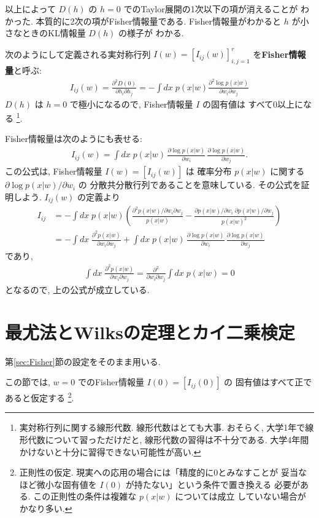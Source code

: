 \documentclass[12pt,twoside]{jarticle}
\renewcommand\d{\partial}
\theoremstyle{jplain}
\theoremstyle{jplain}
\theoremstyle{jplain}
\numberwithin{theorem}{section}
\numberwithin{equation}{section}
\numberwithin{figure}{section}
\numberwithin{table}{section}
\newcommand\secref[1]{第\ref{#1}節}
\begin{document}
以上によって $D(h)$ の $h=0$ でのTaylor展開の1次以下の項が消えることが
わかった. 本質的に2次の項がFisher情報量である.
Fisher情報量がわかると $h$ が小さなときのKL情報量 $D(h)$ の様子が
わかる.

次のようにして定義される実対称行列 $I(w)=[I_{ij}(w)]_{i,j=1}^r$
を{\bfseries Fisher情報量}と呼ぶ:
\begin{align*}
  I_{ij}(w) = \frac{\d^2 D(0)}{\d h_i\d h_j}
  = -\int dx\; p(x|w)\frac{\d^2 \log p(x|w)}{\d w_i\d w_j}
\end{align*}
$D(h)$ は $h=0$ で極小になるので, Fisher情報量 $I$ の固有値は
すべて0以上になる%
\footnote{実対称行列に関する線形代数. 線形代数はとても大事.
おそらく, 大学1年で線形代数について習っただけだと,
線形代数の習得は不十分である.
大学4年間かけないと十分に習得できない可能性が高い.}.

Fisher情報量は次のようにも表せる:
\begin{align*}
  I_{ij}(w)
  = \int dx\;
  p(x|w)\,
  \frac{\d \log p(x|w)}{\d w_i}\,
  \frac{\d \log p(x|w)}{\d w_j}.
\end{align*}
この公式は, Fisher情報量 $I(w)=[I_{ij}(w)]$ は
確率分布 $p(x|w)$ に関する $\d\log p(x|w)/\d w_i$ の
分散共分散行列であることを意味している.
その公式を証明しよう. $I_{ij}(w)$ の定義より
\begin{align*}
  I_{ij}
  &
  = -\int dx\;p(x|w)\left(
    \frac{\d^2 p(x|w)/\d w_i\d w_j}{p(x|w)}
    -\frac{\d p(x|w)/\d w_i\;\d p(x|w)/\d w_j}{p(x|w)^2}
  \right)
  \\ &
  = -\int dx\; \frac{\d^2 p(x|w)}{\d w_i \d w_j}
  + \int dx\; p(x|w)\,
  \frac{\d\log p(x|w)}{\d w_i}\,
  \frac{\d\log p(x|w)}{\d w_j}
\end{align*}
であり,
\begin{align*}
  \int dx\; \frac{\d^2 p(x|w)}{\d w_i \d w_j}
  =\frac{\d^2}{\d w_i \d w_j}\int dx\; p(x|w)
  =0
\end{align*}
となるので, 上の公式が成立している.


\section{最尤法とWilksの定理とカイ二乗検定}

\secref{sec:Fisher}の設定をそのまま用いる.

この節では, $w=0$ でのFisher情報量 $I(0)=[I_{ij}(0)]$ の
固有値はすべて正であると仮定する%
\footnote{正則性の仮定. 現実への応用の場合には「精度的に0とみなすことが
妥当なほど微小な固有値を $I(0)$ が持たない」という条件で置き換える
必要がある.  この正則性の条件は複雑な $p(x|w)$ については成立
していない場合がかなり多い.}.
\end{document}
